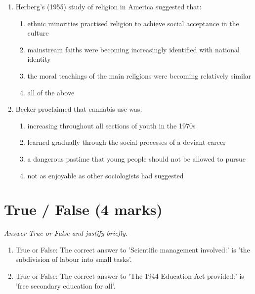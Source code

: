 \documentclass[12pt]{article}
\begin{document}
\begin{enumerate}[label=\arabic*.]
\begin{enumerate}[label=(\alph*)]
    \item the use of corporal punishment by employers
    \item excluding women from participating in waged labour
    \item punctuality, uninterrupted work and the threat of dismissal
    \item making routine tasks less monotonous
\end{enumerate}
\item Herberg's (1955) study of religion in America suggested that:
\begin{enumerate}[label=(\alph*)]
    \item ethnic minorities practised religion to achieve social acceptance in the culture
    \item mainstream faiths were becoming increasingly identified with national identity
    \item the moral teachings of the main religions were becoming relatively similar
    \item all of the above
\end{enumerate}
\item Becker proclaimed that cannabis use was:
\begin{enumerate}[label=(\alph*)]
    \item increasing throughout all sections of youth in the 1970s
    \item learned gradually through the social processes of a deviant career
    \item a dangerous pastime that young people should not be allowed to pursue
    \item not as enjoyable as other sociologists had suggested
\end{enumerate}
\end{enumerate}

\section*{True / False (4 marks)}
\textit{Answer True or False and justify briefly.}
\begin{enumerate}[label=\arabic*.]
\item True or False: The correct answer to 'Scientific management involved:' is 'the subdivision of labour into small tasks'.
\item True or False: The correct answer to 'The 1944 Education Act provided:' is 'free secondary education for all'.
\end{enumerate}
\end{document}
